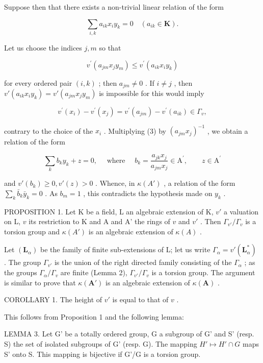 Suppose then that there exists a non-trivial linear relation of the form

\[
\sum_ {i, k} a _ {i k} x _ {i} y _ {k} = 0 \quad (a _ {i k} \in \mathbf {K}).\tag{3}
\]

Let us choose the indices \(j, m\) so that

\[
v ^ {\prime} (a _ {j m} x _ {j} y _ {m}) \leqslant v ^ {\prime} (a _ {i k} x _ {i} y _ {k})
\]

for every ordered pair \((i,k)\) ; then \(a_{jm} \neq 0\) . If \(i \neq j\) , then \(v'(a_{ik}x_iy_k) = v'(a_{jm}x_jy_m)\) is impossible for this would imply

\[
v ^ {\prime} (x _ {i}) - v ^ {\prime} (x _ {j}) = v ^ {\prime} (a _ {j m}) - v ^ {\prime} (a _ {i k}) \in \Gamma_ {v},
\]

contrary to the choice of the \(x_{i}\) . Multiplying (3) by \((a_{jm}x_j)^{-1}\) , we obtain a relation of the form

\[
\sum_ {k} b _ {k} y _ {k} + z = 0, \quad \text { where } \quad b _ {k} = \frac {a _ {j k} x _ {j}}{a _ {j m} x _ {j}} \in \mathrm{A} ^ {\prime}, \qquad z \in \mathrm{A} ^ {\prime}
\]

and \(v'(b_k) \geqslant 0, v'(z) > 0\) . Whence, in \(\kappa(A')\) , a relation of the form \(\sum_{k} \bar{b}_k \bar{y}_k = 0\) . As \(b_m = 1\) , this contradicts the hypothesis made on \(y_k\) .

PROPOSITION 1. Let K be a field, L an algebraic extension of K, \(v'\) a valuation on L, \(v\) its restriction to K and A and A' the rings of \(v\) and \(v'\) . Then \(\Gamma_{v'} / \Gamma_v\) is a torsion group and \(\kappa(A')\) is an algebraic extension of \(\kappa(A)\) .

Let \((\mathbf{L}_{\alpha})\) be the family of finite sub-extensions of L; let us write \(\Gamma_{\alpha} = v'(\mathbf{L}_{\alpha}^{*})\) . The group \(\Gamma_{v'}\) is the union of the right directed family consisting of the \(\Gamma_{\alpha}\) ; as the groups \(\Gamma_{\alpha}/\Gamma_{v}\) are finite (Lemma 2), \(\Gamma_{v'}/\Gamma_{v}\) is a torsion group. The argument is similar to prove that \(\kappa(\mathbf{A}')\) is an algebraic extension of \(\kappa(\mathbf{A})\) .

COROLLARY 1. The height of \(v'\) is equal to that of \(v\) .

This follows from Proposition 1 and the following lemma:

LEMMA 3. Let G' be a totally ordered group, G a subgroup of G' and S' (resp. S) the set of isolated subgroups of G' (resp. G). The mapping \(H' \mapsto H' \cap G\) maps S' onto S. This mapping is bijective if G'/G is a torsion group.


